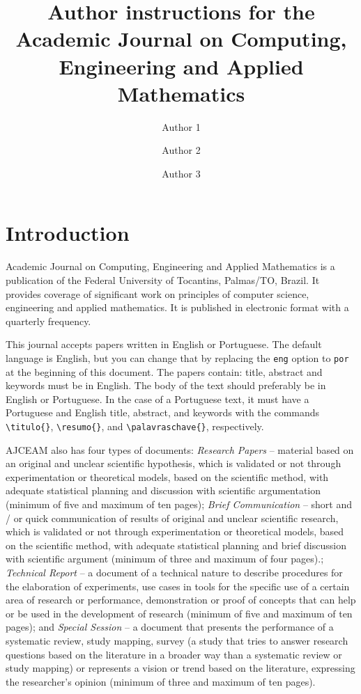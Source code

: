 \documentclass[eng,blind]{ajceam-class}
\title{Author instructions for the Academic Journal on Computing, Engineering and Applied Mathematics}
\author[1]{Author 1}
\author[2]{Author 2}
\author[1,2,3]{Author 3}
\affil[1]{Affiliation 1}
\affil[2]{Affiliation 2}
\affil[3]{Affiliation 3}
\begin{document}
\maketitle
\thispagestyle{fancy}
\printcontactdata

\section{Introduction}
Academic Journal on Computing, Engineering and Applied Mathematics is a publication of the Federal University of Tocantins, Palmas/TO, Brazil. It provides coverage of significant work on principles  of computer science, engineering and applied mathematics. It is published in electronic format with a quarterly frequency.

This journal accepts papers written in English or Portuguese. The default language is English, but you can change that by replacing the \texttt{eng} option to \texttt{por} at the beginning of this document. The papers contain: title, abstract and keywords must be in English. The body of the text should preferably be in English or Portuguese. In the case of a Portuguese text, it must have a Portuguese and English title, abstract, and keywords with the commands \verb|\titulo{}|, \verb|\resumo{}|, and \verb|\palavraschave{}|, respectively.

AJCEAM also has four types of documents: \textit{Research Papers} -- material based on an original and unclear scientific hypothesis, which is validated or not through experimentation or theoretical models, based on the scientific method, with adequate statistical planning and discussion with scientific argumentation (minimum of five and maximum of ten pages); \textit{Brief Communication} -- short and / or quick communication of results of original and unclear scientific research, which is validated or not through experimentation or theoretical models, based on the scientific method, with adequate statistical planning and brief discussion with scientific argument (minimum of three and maximum of four pages).; \textit{Technical Report} -- a document of a technical nature to describe procedures for the elaboration of experiments, use cases in tools for the specific use of a certain area of research or performance, demonstration or proof of concepts that can help or be used in the development of research (minimum of five and maximum of ten pages); and \textit{Special Session} -- a document that presents the performance of a systematic review, study mapping, survey (a study that tries to answer research questions based on the literature in a broader way than a systematic review or study mapping) or represents a vision or trend based on the literature, expressing the researcher's opinion (minimum of three and maximum of ten pages).
\end{document}
